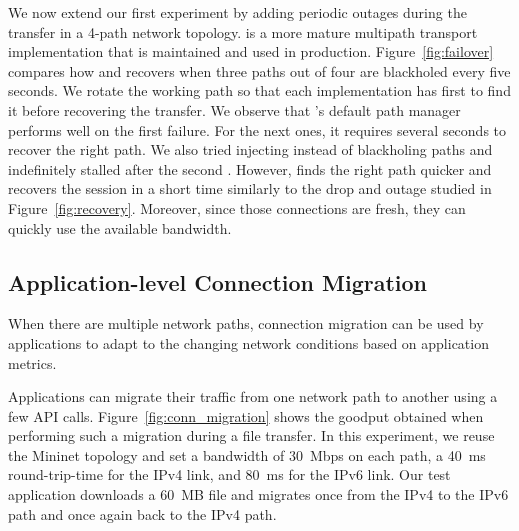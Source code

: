 We now extend our first experiment by adding periodic outages during the 
transfer in a 4-path network topology.
\mptcp is a more mature multipath transport implementation that is maintained 
and used in production. Figure~\ref{fig:failover} compares how 
\mptcp and \tcpls recovers when three paths out of four are blackholed every 
five seconds. We rotate the working path so that each implementation has 
first to find it before recovering the transfer. 
We observe that \mptcp's default path manager performs well on the first
failure. For the next ones, it requires several seconds to recover the right 
path. 
We also tried injecting \tcp \rst instead of blackholing paths and \mptcp 
indefinitely stalled after the second \rst.
However, \tcpls finds the right path quicker and recovers the session in a 
short time similarly to the drop and \rst outage studied in 
Figure~\ref{fig:recovery}. Moreover, since those connections are fresh, they 
can 
quickly use the available bandwidth.

\subsection{Application-level Connection Migration}
\label{sec:app-migration}

When there are multiple network paths, connection migration can be used by 
applications to adapt to the changing network conditions based on application 
metrics.

Applications can migrate their traffic from 
one network path to another using a few \tcpls API calls. 
Figure~\ref{fig:conn_migration} shows the goodput 
obtained when performing such a migration during a file transfer. %
In this experiment, we reuse the Mininet topology %
and set a bandwidth of 30~Mbps on each path, a 40~ms 
round-trip-time for the IPv4 link, and 80~ms for the IPv6 link. Our test application
downloads a 60~MB file and migrates once from the IPv4 to 
the IPv6 path and once again back to the IPv4 path.

